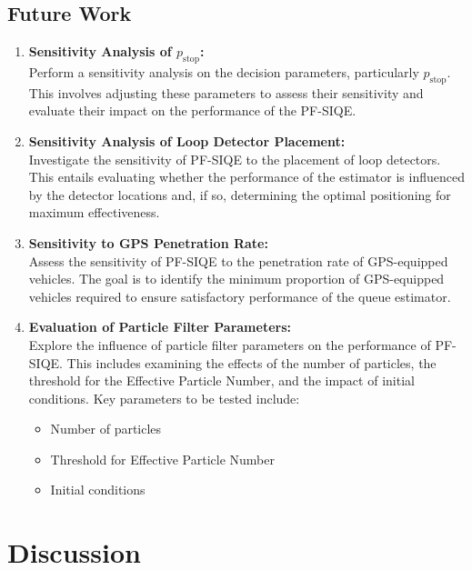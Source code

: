 \subsection{Future Work}
\begin{enumerate}
    \item \textbf{Sensitivity Analysis of $p_\text{stop}$:} \\
    Perform a sensitivity analysis on the decision parameters, particularly $p_\text{stop}$. This involves adjusting these parameters to assess their sensitivity and evaluate their impact on the performance of the PF-SIQE.
    
    \item \textbf{Sensitivity Analysis of Loop Detector Placement:} \\
    Investigate the sensitivity of PF-SIQE to the placement of loop detectors. This entails evaluating whether the performance of the estimator is influenced by the detector locations and, if so, determining the optimal positioning for maximum effectiveness.
    
    \item \textbf{Sensitivity to GPS Penetration Rate:} \\
    Assess the sensitivity of PF-SIQE to the penetration rate of GPS-equipped vehicles. The goal is to identify the minimum proportion of GPS-equipped vehicles required to ensure satisfactory performance of the queue estimator.
    
    \item \textbf{Evaluation of Particle Filter Parameters:} \\
    Explore the influence of particle filter parameters on the performance of PF-SIQE. This includes examining the effects of the number of particles, the threshold for the Effective Particle Number, and the impact of initial conditions. Key parameters to be tested include:
    \begin{itemize}
        \item Number of particles
        \item Threshold for Effective Particle Number
        \item Initial conditions
    \end{itemize}
\end{enumerate}







\section{Discussion}


